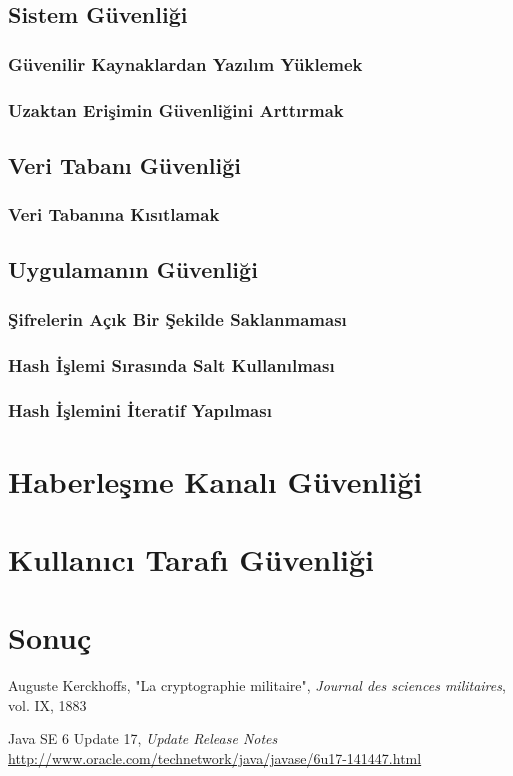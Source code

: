 \documentclass[11pt]{report}
\begin{document}
\section{Sistem Güvenliği}
\subsection{Güvenilir Kaynaklardan Yazılım Yüklemek}
\subsection{Uzaktan Erişimin Güvenliğini Arttırmak}
\section{Veri Tabanı Güvenliği}
\subsection{Veri Tabanına Kısıtlamak}
\section{Uygulamanın Güvenliği}
\subsection{Şifrelerin Açık Bir Şekilde Saklanmaması}
\subsection{Hash İşlemi Sırasında Salt Kullanılması}
\subsection{Hash İşlemini İteratif Yapılması}

\chapter{Haberleşme Kanalı Güvenliği}

\chapter{Kullanıcı Tarafı Güvenliği}

\chapter{Sonuç}


\begin{thebibliography}{9}

  Auguste Kerckhoffs,
  "La cryptographie militaire",
  \emph{Journal des sciences militaires},
  vol. IX,
  1883

  Java SE 6 Update 17, \emph{Update Release Notes} \\
  \url{http://www.oracle.com/technetwork/java/javase/6u17-141447.html}

\end{thebibliography}
\end{document}
